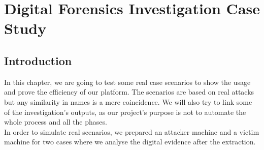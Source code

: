 \renewcommand\thechapter{\Roman{chapter}}
\chapter{Digital Forensics Investigation Case Study}
\newpage
{}
\section*{Introduction}
In this chapter, we are going to test some real case scenarios to show the usage and prove the efficiency of our platform. The scenarios are based on real attacks but any similarity in names is a mere coincidence. We will also try to link some of the investigation's outputs, as our project's purpose is not to automate the whole process and all the phases.\\
In order to simulate real scenarios, we prepared an attacker machine and a victim machine for two cases where we analyse the digital evidence after the extraction.


